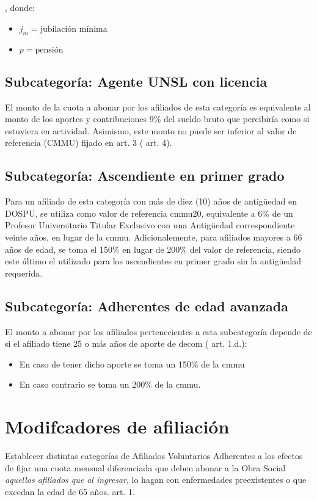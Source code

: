 , donde:
\begin{itemize}
    \item $j_m = \text{jubilación mínima}$
    \item $p = \text{pensión}$
\end{itemize}

\subsection{Subcategoría: Agente UNSL con licencia}
El monto de la cuota a abonar por los afiliados de esta categoría es equivalente al monto de los aportes y contribuciones 9\% del sueldo bruto que percibiría como si estuviera en actividad. Asimismo, este monto no puede ser inferior al valor de referencia (CMMU) fijado en \cite{dospuRes21} art. 3 (\cite{dospuRes21} art. 4).

\subsection{Subcategoría: Ascendiente en primer grado}
Para un afiliado de esta categoría con más de diez (10) años de antigüedad en DOSPU, se utiliza como valor de referencia \acrshort{cmmu}20, equivalente a 6\% de un Profesor Universitario Titular Exclusivo con una Antigüedad correspondiente veinte años, en lugar de la \acrshort{cmmu}\cite{dospuRes60}.
Adicionalemente, para afiliados mayores a 66 años de edad, se toma el 150\% en lugar de 200\% del valor de referencia, siendo este último el utilizado para los ascendientes en primer grado sin la antigüedad requerida.

\subsection{Subcategoría: Adherentes de edad avanzada}
El monto a abonar por los afiliados pertenecientes a esta subcategoría depende de si el afiliado tiene 25 o más años de aporte de \acrfull{decom} (\cite{dospuRes7} art. 1.d.):
\begin{itemize}
    \item En caso de tener dicho aporte se toma un 150\% de la \acrshort{cmmu}
    \item En caso contrario se toma un 200\% de la \acrshort{cmmu}.
\end{itemize}

\section{Modifcadores de afiliación}
\begin{displayquote}
Establecer distintas categorías de Afiliados Voluntarios Adherentes a los efectos de fijar una cuota mensual diferenciada que deben abonar a la Obra Social \emph{aquellos afiliados que al ingresar}, lo hagan con enfermedades preexistentes o que excedan la edad de 65 años. 
\hfill\parencite{dospuRes7} art. 1.
\end{displayquote}

